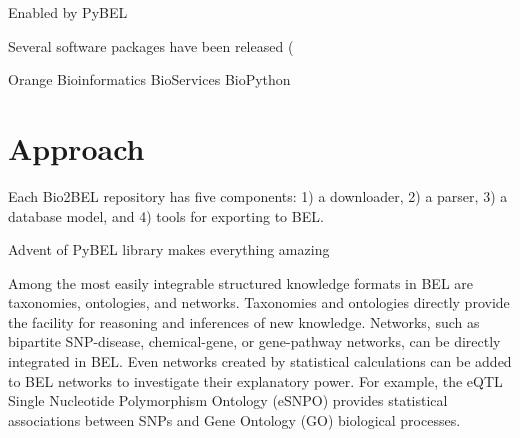 \documentclass{bioinfo}
\begin{document}
Enabled by PyBEL \citep{Hoyt2017}

Several software packages have been released (

Orange Bioinformatics \citep{Demsar2013}
BioServices \citep{Cokelaer2013}
BioPython \citep{Cock2009}

\section{Approach}

Each Bio2BEL repository has five components: 1) a downloader, 2) a parser, 3) a database model, and 4) tools for exporting to BEL.

Advent of PyBEL library makes everything amazing

Among the most easily integrable structured knowledge formats in BEL are taxonomies, ontologies, and networks. Taxonomies and ontologies directly provide the facility for reasoning and inferences of new knowledge. Networks, such as bipartite SNP-disease, chemical-gene, or gene-pathway networks, can be directly integrated in BEL. Even networks created by statistical calculations can be added to BEL networks to investigate their explanatory power. For example, the eQTL Single Nucleotide Polymorphism Ontology (eSNPO) provides statistical associations between SNPs and Gene Ontology (GO) biological processes.
\end{document}
